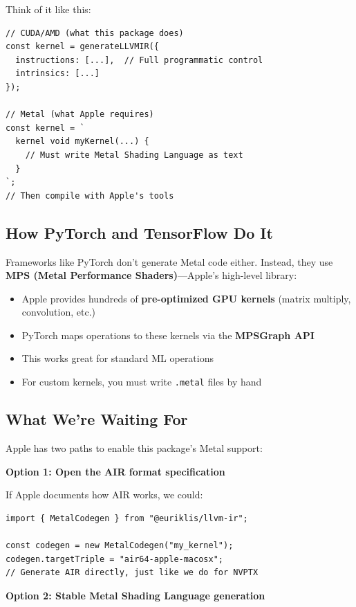\documentclass[11pt]{article}
\begin{document}
Think of it like this:
\begin{lstlisting}[style=ts]
// CUDA/AMD (what this package does)
const kernel = generateLLVMIR({
  instructions: [...],  // Full programmatic control
  intrinsics: [...]
});

// Metal (what Apple requires)
const kernel = `
  kernel void myKernel(...) {
    // Must write Metal Shading Language as text
  }
`;
// Then compile with Apple's tools
\end{lstlisting}

\subsection{How PyTorch and TensorFlow Do It}

Frameworks like PyTorch don't generate Metal code either. Instead, they use \textbf{MPS (Metal Performance Shaders)}\cite{pytorchmps}\cite{applepytorch}—Apple's high-level library:

\begin{itemize}[noitemsep]
  \item Apple provides hundreds of \textbf{pre-optimized GPU kernels} (matrix multiply, convolution, etc.)\cite{metaldocs}
  \item PyTorch maps operations to these kernels via the \textbf{MPSGraph API}
  \item This works great for standard ML operations
  \item For custom kernels, you must write \texttt{.metal} files by hand\cite{metalspec}
\end{itemize}

\subsection{What We're Waiting For}

Apple has two paths to enable this package's Metal support:

\textbf{Option 1: Open the AIR format specification}

If Apple documents how AIR works\cite{airformat}, we could:
\begin{lstlisting}[style=ts]
import { MetalCodegen } from "@euriklis/llvm-ir";

const codegen = new MetalCodegen("my_kernel");
codegen.targetTriple = "air64-apple-macosx";
// Generate AIR directly, just like we do for NVPTX
\end{lstlisting}

\textbf{Option 2: Stable Metal Shading Language generation}
\end{document}
